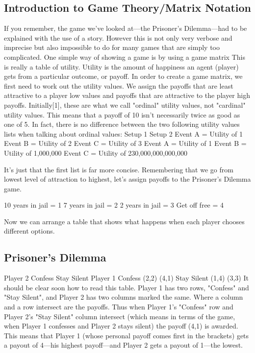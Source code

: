 \subsection*{Introduction to Game Theory/Matrix Notation}

If you remember, the game we've looked at—the Prisoner's Dilemma—had to be explained with the use of a story. However this is not only very verbose and imprecise but also impossible to do for many games that are simply too complicated. One simple way of showing a game is by using a game matrix 
This is really a table of utility. Utility is the amount of happiness an agent (player) gets from a particular outcome, or payoff. 
In order to create a game matrix, we first need to work out the utility values. We assign the payoffs that are least attractive to a player low values and payoffs that are attractive to the player high payoffs. Initially[1], these are what we call "ordinal" utility values, not "cardinal" utility values. This means that a payoff of 10 isn't necessarily twice as good as one of 5. In fact, there is no difference between the two following utility values lists when talking about ordinal values: 
Setup 1
Setup 2 
Event A = Utility of 1
Event B = Utility of 2
Event C = Utility of 3
Event A = Utility of 1
Event B = Utility of 1,000,000
Event C = Utility of 230,000,000,000,000

It's just that the first list is far more concise. Remembering that we go from lowest level of attraction to highest, let's assign payoffs to the Prisoner's Dilemma game. 

10 years in jail = 1
7 years in jail  = 2
2 years in jail  = 3
Get off free   = 4

Now we can arrange a table that shows what happens when each player chooses different options. 

\subsection*{Prisoner's Dilemma}
Player 2 
Confess
Stay Silent 
Player 1 
Confess 
(2,2)
(4,1) 
Stay Silent 
(1,4)
(3,3) 
It should be clear soon how to read this table. Player 1 has two rows, "Confess" and "Stay Silent", and Player 2 has two columns marked the same. Where a column and a row intersect are the payoffs. Thus when Player 1's "Confess" row and Player 2's "Stay Silent" column intersect (which means in terms of the game, when Player 1 confesses and Player 2 stays silent) the payoff (4,1) is awarded. This means that Player 1 (whose personal payoff comes first in the brackets) gets a payout of 4—his highest payoff—and Player 2 gets a payout of 1—the lowest. 
